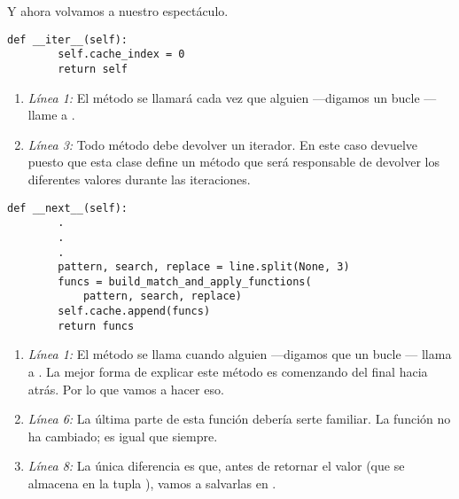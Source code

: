 Y ahora volvamos a nuestro espectáculo.

\noindent\begin{minipage}{\textwidth}
\begin{lstlisting}[mathescape=True]
  def __iter__(self):
        self.cache_index = 0
        return self
\end{lstlisting}
\end{minipage}

\begin{enumerate}

\item \emph{Línea 1:} El método  se llamará cada vez que alguien ---digamos un bucle --- llame a .

\item \emph{Línea 3:} Todo método  debe devolver un iterador. En este caso devuelve  puesto que esta clase define un método  que será responsable de devolver los diferentes valores durante las iteraciones.

\end{enumerate}

\noindent\begin{minipage}{\textwidth}
\begin{lstlisting}[mathescape=True]
   def __next__(self):
        .
        .
        .
        pattern, search, replace = line.split(None, 3)
        funcs = build_match_and_apply_functions(
            pattern, search, replace)
        self.cache.append(funcs)
        return funcs
\end{lstlisting}
\end{minipage}

\begin{enumerate}

\item \emph{Línea 1:} El método  se llama cuando alguien ---digamos que un bucle --- llama a . La mejor forma de explicar este método es comenzando del final hacia atrás. Por lo que vamos a hacer eso.

\item \emph{Línea 6:} La última parte de esta función debería serte familiar. La función  no ha cambiado; es igual que siempre.

\item \emph{Línea 8:} La única diferencia es que, antes de retornar el valor (que se almacena en la tupla ), vamos a salvarlas en .

\end{enumerate}
 
